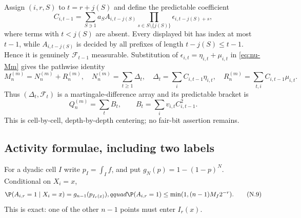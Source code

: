\documentclass[11pt]{article}
\numberwithin{equation}{section}
\newcommand{\1}{\mathbf 1}\newcommand{\F}{\mathcal F}\newcommand{\D}{\mathcal D}
\begin{document}
Assign $(i,r,S)$ to $t=r+j(S)$ and define the predictable coefficient
\begin{equation}\label{eq:nu-C}
 C_{i,t-1}=\sum_{S\ni1}a_S A_{i,t-j(S)}
 \prod_{s\in S\setminus\{j(S)\}}
       \epsilon_{i,t-j(S)+s},                                    \tag{N.6}
\end{equation}
where terms with $t<j(S)$ are absent.  Every displayed bit has index at
most $t-1$, while $A_{i,t-j(S)}$ is decided by all prefixes of length
$t-j(S)\le t-1$.  Hence it is genuinely $\F_{t-1}$ measurable.  Substitution
of $\epsilon_{i,t}=\eta_{i,t}+\mu_{i,t}$ in \eqref{eq:nu-Mm} gives the
pathwise identity
\begin{equation}\label{eq:nu-decomposition}
 M_n^{(m)}=N_n^{(m)}+R_n^{(m)},\quad
 N_n^{(m)}=\sum_{t\ge1}\Delta_t,\quad
 \Delta_t=\sum_iC_{i,t-1}\eta_{i,t},\quad
 R_n^{(m)}=\sum_{t,i}C_{i,t-1}\mu_{i,t}.                       \tag{N.7}
\end{equation}
Thus $(\Delta_t,\F_t)$ is a martingale-difference array and its predictable
bracket is
\begin{equation}\label{eq:nu-bracket}
 Q_n^{(m)}=\sum_tB_t,\qquad B_t=\sum_i v_{i,t}C_{i,t-1}^2.       \tag{N.8}
\end{equation}
This is cell-by-cell, depth-by-depth centering; no fair-bit assertion remains.

\subsection{Activity formulae, including two labels}
For a dyadic cell $I$ write $p_I=\int_I f$, and put
$g_N(p)=1-(1-p)^N$.  Conditional on $X_i=x$,
\begin{equation}\label{eq:nu-oneactivity}
 \P(A_{i,r}=1\mid X_i=x)=g_{n-1}(p_{I_r(x)}),qquad
 \P(A_{i,r}=1)\le \min(1,(n-1)M_f2^{-r}).                    \tag{N.9}
\end{equation}
This is exact: one of the other $n-1$ points must enter $I_r(x)$.
\end{document}
